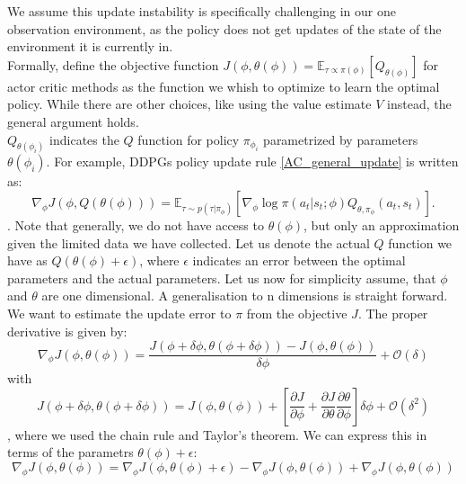 We assume this update instability is specifically challenging in our one observation environment, as the policy does not 
get updates of the state of the environment it is currently in. \\
Formally, define the objective function $J(\phi, \theta(\phi)) = \mathbb{E}_{\tau \propto \pi(\phi)}\left[Q_{\theta(\phi)}\right]$ for actor critic methods 
as the function we whish to optimize to learn the optimal policy. While there are other choices, like using the value estimate $V$ instead, the general argument holds.\\
$Q_{\theta(\phi_i)}$ indicates the $Q$ function for policy $\pi_{\phi_{i}}$ parametrized by parameters 
$\theta(\phi_i)$. For example, DDPGs policy update rule \ref{AC_general_update} is written as:
\begin{equation}
    \nabla_{\phi} J(\phi, Q(\theta(\phi))) = \mathbb{E}_{\tau \sim p(\tau | \pi_{\phi})} \left[\nabla_{\phi} \log \pi(a_t|s_t;\phi) Q_{\theta, \pi_\phi}(a_t, s_t) \right].
\end{equation}
. Note that generally, we do not have access to $\theta(\phi)$, but only an approximation given the limited data we have collected. Let us denote the actual 
$Q$ function we have as $Q(\theta(\phi) + \epsilon)$, where $\epsilon$ indicates an error between the optimal parameters and the actual parameters.
Let us now for simplicity assume, that $\phi$ and $\theta$ are one dimensional. A generalisation to n dimensions is straight forward. We want 
to estimate the update error to $\pi$ from the objective $J$. The proper derivative is given by:
\begin{equation}
    \nabla_{\phi} J(\phi, \theta(\phi)) = \frac{J(\phi + \delta \phi, \theta(\phi + \delta \phi)) - J(\phi, \theta(\phi))}{\delta \phi} + \mathcal{O}(\delta)
\end{equation}
with 
\begin{equation}
    J(\phi + \delta \phi, \theta(\phi + \delta \phi)) = J(\phi, \theta(\phi)) + \left[ 
        \frac{\partial J}{\partial \phi} + \frac{\partial J}{\partial \theta} \frac{\partial \theta}{\partial \phi}
    \right] \delta \phi  + \mathcal{O}(\delta^2)
\end{equation}
, where we used the chain rule and Taylor's theorem. 
We can express this in terms of the parametrs $\theta(\phi) + \epsilon$:
\begin{equation}
    \nabla_{\phi} J(\phi, \theta(\phi)) = \nabla_{\phi} J(\phi, \theta(\phi) + \epsilon) - \nabla_{\phi} J(\phi, \theta(\phi)) + \nabla_{\phi} J(\phi, \theta(\phi))
\end{equation}
